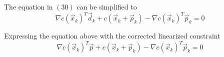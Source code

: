 \documentclass[a4paper,10pt]{article}
\begin{document}
\begin{enumerate}
{        The equation in $(30)$ can be simplified to
        \[
            \nabla c\left(\vec{x}_{k}\right)^{T} \vec{d}_{k}+c\left(\vec{x}_{k}+\vec{p}_{k}\right)-\nabla c\left(\vec{x}_{k}\right)^{T} \vec{p}_{k}=0
        \]

        Expressing the equation above with the corrected linearized constraint
        \[
            \nabla c\left(\vec{x}_{k}\right)^{T} \vec{p}+c\left(\vec{x}_{k}+\vec{p}_{k}\right)-\nabla c\left(\vec{x}_{k}\right)^{T} \vec{p}_{k}=0
        \]
    }

\end{enumerate}
\end{document}
